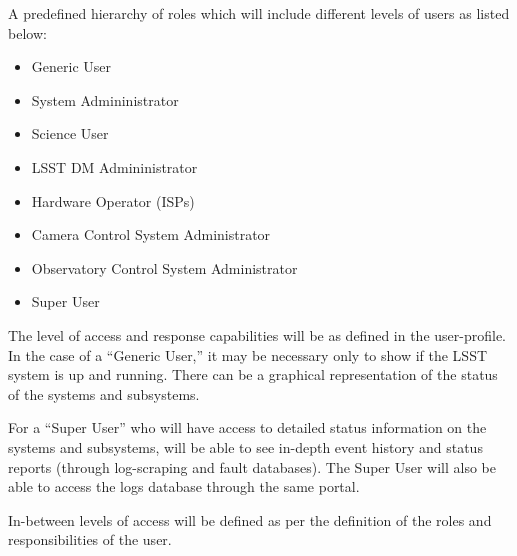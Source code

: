 A predefined hierarchy of roles which will include different levels of users as
listed below:

\begin{itemize}

\item Generic User
\item System Admininistrator
\item Science User
\item LSST DM Admininistrator
\item Hardware Operator (ISPs)
\item Camera Control System Administrator
\item Observatory Control System Administrator
\item Super User

\end{itemize}

The level of access and response capabilities will be as defined in the
user-profile. In the case of a ``Generic User,'' it may be necessary only to show
if the LSST system is up and running. There can be a graphical representation of
the status of the systems and subsystems.

For a ``Super User'' who will have access to detailed status information on the
systems and subsystems, will be able to see in-depth event history and status
reports (through log-scraping and fault databases). The Super User will also be
able to access the logs database through the same portal.

In-between levels of access will be defined as per the definition of the roles
and responsibilities of the user.
